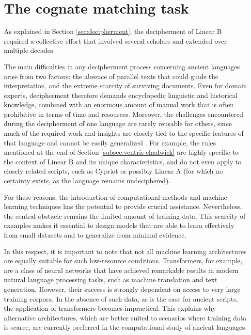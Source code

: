 \chapter{The cognate matching task}
As explained in Section \ref{sec:decipherment}, the decipherment of Linear B required a collective effort that involved several scholars and extended over multiple decades.

The main difficulties in any decipherment process concerning ancient languages arise from two factors: the absence of parallel texts that could guide the interpretation, and the extreme scarcity of surviving documents.
Even for domain experts, decipherment therefore demands encyclopedic linguistic and historical knowledge, combined with an enormous amount of manual work that is often prohibitive in terms of time and resources.
Moreover, the challenges encountered during the decipherment of one language are rarely reusable for others, since much of the required work and insights are closely tied to the specific features of that language and cannot be easily generalized \cite{luo}.
For example, the rules mentioned at the end of Section \ref{subsec:ventris-chadwick} are highly specific to the context of Linear B and its unique characteristics, and do not even apply to closely related scripts, such as Cypriot or possibly Linear A (for which no certainty exists, as the language remains undeciphered).

For these reasons, the introduction of computational methods and machine learning techniques has the potential to provide crucial assistance.
Nevertheless, the central obstacle remains the limited amount of training data.
This scarcity of examples makes it essential to design models that are able to learn effectively from small datasets and to generalize from minimal evidence.

In this respect, it is important to note that not all machine learning architectures are equally suitable for such low-resource conditions.
Transformers, for example, are a class of neural networks that have achieved remarkable results in modern natural language processing tasks, such as machine translation and text generation.
However, their success is strongly dependent on access to very large training corpora.
In the absence of such data, as is the case for ancient scripts, the application of transformers becomes impractical.
This explains why alternative architectures, which are better suited to scenarios where training data is scarce, are currently preferred in the computational study of ancient languages.

